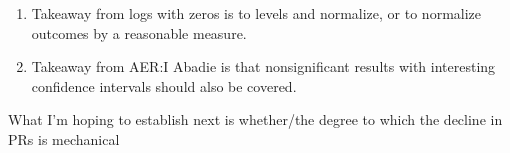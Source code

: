 \documentclass[12pt,notitlepage]{article}
\begin{document}
\begin{enumerate}
    \item Takeaway from logs with zeros is to levels and normalize, or to normalize outcomes by a reasonable measure.
    \item Takeaway from AER:I Abadie is that nonsignificant results with interesting confidence intervals should also be covered. 
\end{enumerate}

What I'm hoping to establish next is whether/the degree to which the decline in PRs is mechanical
\end{document}
